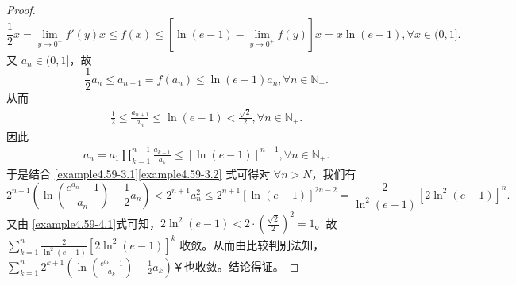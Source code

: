 \documentclass[../../main.tex]{subfiles}
\begin{document}
\begin{proof}
\[
\frac{1}{2} x = \lim_{y \to 0^+} f'(y) x \leqslant  f(x) \leqslant  [\ln(e - 1) - \lim_{y \to 0^+} f(y)] x = x \ln(e - 1),\forall x \in (0, 1].
\]
又 \(a_n \in (0, 1]\)，故
\[
\frac{1}{2} a_n \leqslant  a_{n + 1} = f(a_n) \leqslant  \ln(e - 1) a_n,\forall n \in \mathbb{N}_+.
\]
从而
\begin{align}
\frac{1}{2} \leqslant  \frac{a_{n + 1}}{a_n} \leqslant  \ln(e - 1) < \frac{\sqrt{2}}{2},\forall n \in \mathbb{N}_+. \label{example4.59-4.1} 
\end{align}
因此
\begin{align}
a_n = a_1 \prod_{k = 1}^{n - 1} \frac{a_{k + 1}}{a_k} \leqslant  [\ln(e - 1)]^{n - 1},\forall n \in \mathbb{N}_+. \label{example4.59-3.2}
\end{align}
于是结合 \eqref{example4.59-3.1}\eqref{example4.59-3.2} 式可得对 \(\forall n > N\)，我们有
\[
2^{n + 1}\left(\ln\left(\frac{e^{a_n} - 1}{a_n}\right) - \frac{1}{2} a_n\right) < 2^{n + 1} a_n^2 \leqslant  2^{n + 1}[\ln(e - 1)]^{2n - 2} = \frac{2}{\ln^2(e - 1)}[2\ln^2(e - 1)]^n.
\]
又由 \eqref{example4.59-4.1}式可知，\(2\ln^2(e - 1) < 2\cdot\left(\frac{\sqrt{2}}{2}\right)^2 = 1\)。故 \(\sum_{k = 1}^n \frac{2}{\ln^2(e - 1)}[2\ln^2(e - 1)]^k\) 收敛。从而由比较判别法知，$\sum_{k = 1}^n 2^{k + 1}\left(\ln\left(\frac{e^{a_k} - 1}{a_k}\right)- \frac{1}{2} a_k\right)$￥也收敛。结论得证。
\end{proof}
\end{document}
